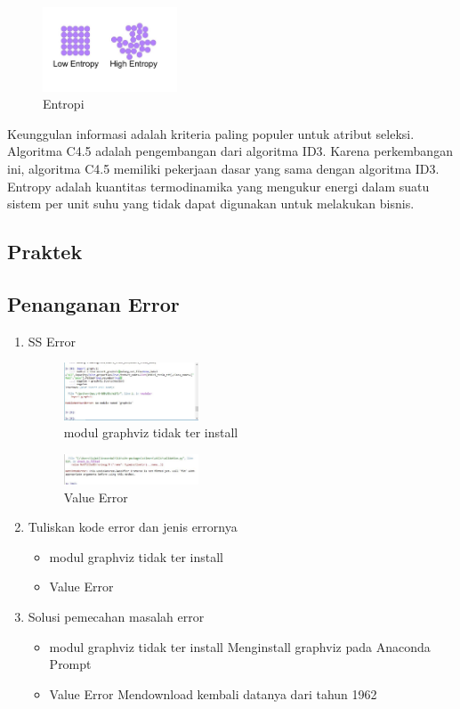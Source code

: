 \begin{enumerate}
	\hfill\break
	\begin{figure}[H]
		\includegraphics[width=4cm]{figures/1174038/2/entropi.jpg}
		\centering
		\caption{Entropi}
	\end{figure}
	\hfill\break
	Keunggulan informasi adalah kriteria paling populer untuk atribut seleksi. Algoritma C4.5 adalah pengembangan dari algoritma ID3. 
	Karena perkembangan ini, algoritma C4.5 memiliki pekerjaan dasar yang sama dengan algoritma ID3.
	Entropy adalah kuantitas termodinamika yang mengukur energi dalam suatu sistem per unit suhu yang tidak dapat digunakan untuk melakukan bisnis.
\end{enumerate}
\subsection{Praktek}

\subsection{Penanganan Error}
\begin{enumerate}
	\item SS Error
	\hfill\break
	\begin{figure}[H]
		\includegraphics[width=4cm]{figures/1174038/2/error/1.JPG}
		\centering
		\caption{modul graphviz tidak ter install}
	\end{figure}
	\begin{figure}[H]
		\includegraphics[width=4cm]{figures/1174038/2/error/2.JPG}
		\centering
		\caption{Value Error}
	\end{figure}
	\item Tuliskan kode error dan jenis errornya
	\hfill\break
	\begin{itemize}
		\item modul graphviz tidak ter install
		\item Value Error
	\end{itemize}
	\item Solusi pemecahan masalah error
	\hfill\break
	\begin{itemize}
		\item modul graphviz tidak ter install
		\hfill\break
		Menginstall graphviz pada Anaconda Prompt
		\item Value Error
		\hfill\break
		Mendownload kembali datanya dari tahun 1962
	\end{itemize}
\end{enumerate}

